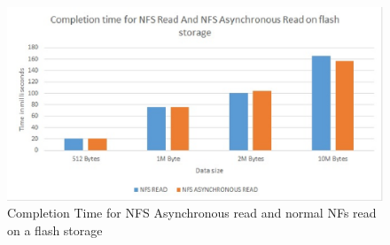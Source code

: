 \begin{figure}
\centering
\includegraphics[scale=1.0]{figures/completion_time.eps}
\caption{Completion	Time for NFS Asynchronous read and normal NFs read on a flash storage}
\label{fig:NFSCompletionTimes}
\end{figure}






 
 
 








